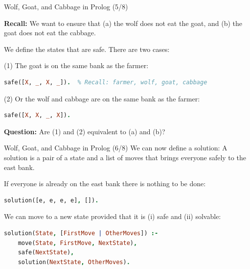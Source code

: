 \begin{frame}[fragile]{Wolf, Goat, and Cabbage in Prolog (5/8)}

\textbf{Recall:} We want to ensure that (a) the wolf does not eat the goat, and
(b) the goat does not eat the cabbage.

We define the states that are safe. There are two cases: 

(1) The goat is on the same bank as the farmer:

\begin{lstlisting}[language=prolog, xleftmargin=0.5cm]
safe([X, _, X, _]).  % Recall: farmer, wolf, goat, cabbage
\end{lstlisting}

(2) Or the wolf and cabbage are on the same bank as the farmer:

\begin{lstlisting}[language=prolog, xleftmargin=0.5cm]
safe([X, X, _, X]).
\end{lstlisting}

\pause 

\textbf{Question:} Are (1) and (2) equivalent to (a) and (b)?

\end{frame}

\begin{frame}[fragile]{Wolf, Goat, and Cabbage in Prolog (6/8)}
We can now define a solution: A solution is a pair of a state and a list of
moves that brings everyone safely to the east bank.

\pause

If everyone is already on the east bank there is nothing to be done:

\begin{lstlisting}[language=prolog, xleftmargin=0.5cm]
solution([e, e, e, e], []).
\end{lstlisting}

\pause 

We can move to a new state provided that it is (i) safe and (ii) solvable:

\begin{lstlisting}[language=prolog, xleftmargin=0.5cm]
solution(State, [FirstMove | OtherMoves]) :- 
    move(State, FirstMove, NextState), 
    safe(NextState), 
    solution(NextState, OtherMoves).
\end{lstlisting}
\end{frame}

